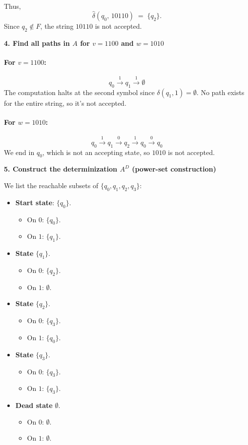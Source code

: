 \documentclass{article}
\theoremstyle{theorem}
\theoremstyle{definition}
\theoremstyle{remark}
\begin{document}
Thus,
\[
\hat{\delta}(q_0,\,10110) \;=\; \{q_2\}.
\]
Since $q_2 \notin F$, the string $10110$ is not accepted.

\textbf{4. Find all paths in $A$ for $v = 1100$ and $w = 1010$}

\paragraph{For $v = 1100$:}
\[
q_0 \xrightarrow{\,1\,} q_1 \xrightarrow{\,1\,} \emptyset
\]
The computation halts at the second symbol since $\delta(q_1,1) = \emptyset$. No path exists for the entire string, so it's not accepted.

\paragraph{For $w = 1010$:}
\[
q_0 \xrightarrow{\,1\,} q_1 
\xrightarrow{\,0\,} q_2 
\xrightarrow{\,1\,} q_0 
\xrightarrow{\,0\,} q_0
\]
We end in $q_0$, which is not an accepting state, so $1010$ is not accepted.

\textbf{5. Construct the determinization $A^D$ (power-set construction)}

We list the reachable subsets of $\{q_0, q_1, q_2, q_3\}$:

\begin{itemize}
\item \textbf{Start state}: $\{q_0\}$. 
  \begin{itemize}
  \item On $0$: $\{q_0\}$.
  \item On $1$: $\{q_1\}$.
  \end{itemize}
\item \textbf{State} $\{q_1\}$.
  \begin{itemize}
  \item On $0$: $\{q_2\}$.
  \item On $1$: $\emptyset$.
  \end{itemize}
\item \textbf{State} $\{q_2\}$.
  \begin{itemize}
  \item On $0$: $\{q_3\}$.
  \item On $1$: $\{q_0\}$.
  \end{itemize}
\item \textbf{State} $\{q_3\}$.
  \begin{itemize}
  \item On $0$: $\{q_3\}$.
  \item On $1$: $\{q_3\}$.
  \end{itemize}
\item \textbf{Dead state} $\emptyset$.
  \begin{itemize}
  \item On $0$: $\emptyset$.
  \item On $1$: $\emptyset$.
  \end{itemize}
\end{itemize}
\end{document}
